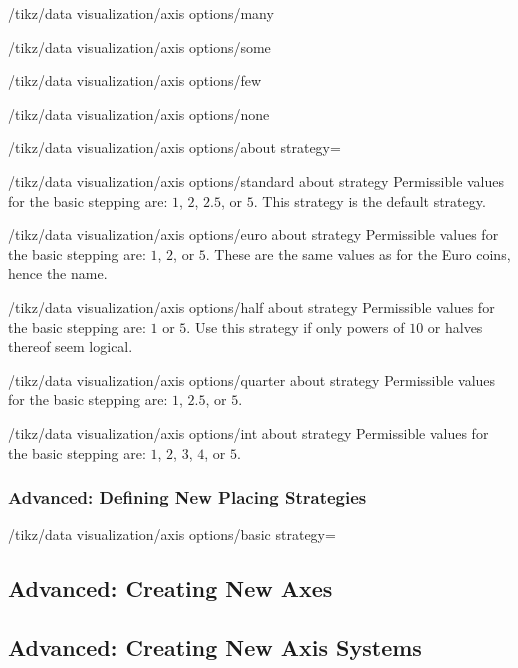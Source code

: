 \begin{key}{/tikz/data visualization/axis options/many}
\end{key}

\begin{key}{/tikz/data visualization/axis options/some}
\end{key}

\begin{key}{/tikz/data visualization/axis options/few}
\end{key}

\begin{key}{/tikz/data visualization/axis options/none}
\end{key}

\begin{key}{/tikz/data visualization/axis options/about strategy=}
\end{key}

\begin{key}{/tikz/data visualization/axis options/standard about
    strategy}
  Permissible values for the basic stepping are: $1$, $2$, $2.5$, or
  $5$.
  This strategy is the default strategy.
\end{key}

\begin{key}{/tikz/data visualization/axis options/euro about strategy}
  Permissible values for the basic stepping are: $1$, $2$, or
  $5$. These are the same values as for the Euro coins, hence the
  name. 
\end{key}

\begin{key}{/tikz/data visualization/axis options/half about strategy}
  Permissible values for the basic stepping are: $1$ or $5$. Use this
  strategy if only powers of $10$ or halves thereof seem logical.
\end{key}

\begin{key}{/tikz/data visualization/axis options/quarter about strategy}
  Permissible values for the basic stepping are: $1$, $2.5$, or $5$. 
\end{key}

\begin{key}{/tikz/data visualization/axis options/int about strategy}
  Permissible values for the basic stepping are: $1$, $2$, $3$, $4$,
  or $5$.
\end{key}



\subsubsection{Advanced: Defining New Placing Strategies}

\begin{key}{/tikz/data visualization/axis options/basic strategy=}
  
\end{key}
  
\subsection{Advanced: Creating New Axes}

\subsection{Advanced: Creating New Axis Systems}
